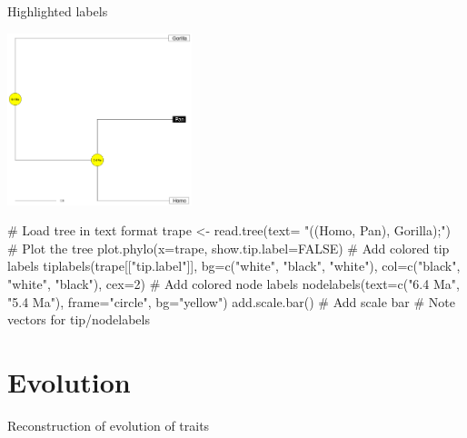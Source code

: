 \documentclass[compress, ucs, xelatex, 11pt, xcolor=svgnames,
  hyperref={
    bookmarks=true,
    unicode=true,
    colorlinks=true,
    pdftitle={Molecular data in R},
    plainpages=false,
    pdfauthor={Vojtech Zeisek},
    pdfsubject={Course about phylogeny and evolution in R},
    pdfcreator={XeLaTeX},
    pdfkeywords={R, evolution, phylogeny, molecular data},
    linkcolor=Tomato,
    anchorcolor=SaddleBrown,
    citecolor=Goldenrod,
    filecolor=DarkMagenta,
    menucolor=Sienna,
    urlcolor=DarkTurquoise,
    pdftex},
  url={hyphens, lowtilde} %
  ]{beamer}
\begin{document}
\begin{frame}[fragile]{Highlighted labels}
\begin{multicols}{2}
  \vfill
  \includegraphics[height=5cm]{highlight.png}
  \vfill
  \begin{spluscode}
    # Load tree in text format
    trape <- read.tree(text=
      "((Homo, Pan), Gorilla);")
    # Plot the tree
    plot.phylo(x=trape,
      show.tip.label=FALSE)
    # Add colored tip labels
    tiplabels(trape[["tip.label"]],
      bg=c("white", "black",
      "white"), col=c("black",
      "white", "black"), cex=2)
    # Add colored node labels
    nodelabels(text=c("6.4 Ma",
      "5.4 Ma"), frame="circle",
      bg="yellow")
    add.scale.bar() # Add scale bar
    # Note vectors for tip/nodelabels
  \end{spluscode}
\end{multicols}
\end{frame}

\section{Evolution}

\begin{frame}{Reconstruction of evolution of traits}
  \tableofcontents[currentsection, sectionstyle=show/hide, hideothersubsections]
\end{frame}
\end{document}
